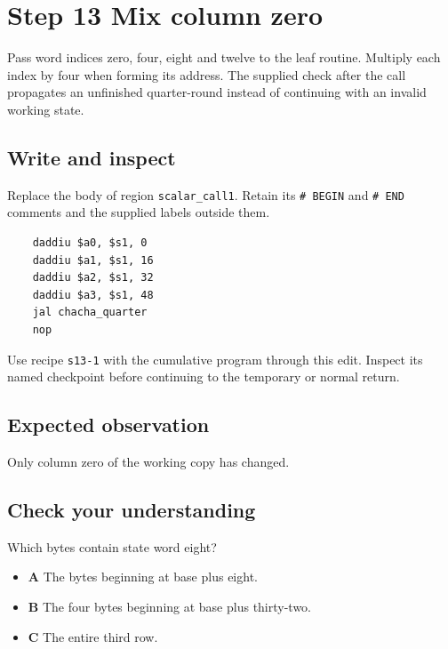 \section{Step 13 Mix column zero}\label{chacha-s13}

Pass word indices zero, four, eight and twelve to the leaf routine. Multiply each index by four when forming its address. The supplied check after the call propagates an unfinished quarter-round instead of continuing with an invalid working state.

\subsection{Write and inspect}
Replace the body of region \texttt{scalar\_call1}. Retain its \texttt{\# BEGIN} and \texttt{\# END} comments and the supplied labels outside them.

\begin{verbatim}
    daddiu $a0, $s1, 0
    daddiu $a1, $s1, 16
    daddiu $a2, $s1, 32
    daddiu $a3, $s1, 48
    jal chacha_quarter
    nop
\end{verbatim}

Use recipe \texttt{s13-1} with the cumulative program through this edit. Inspect its named checkpoint before continuing to the temporary or normal return.

\subsection{Expected observation}
Only column zero of the working copy has changed.

\subsection{Check your understanding}
Which bytes contain state word eight?

\begin{itemize}
\item \textbf{A} The bytes beginning at base plus eight.
\item \textbf{B} The four bytes beginning at base plus thirty-two.
\item \textbf{C} The entire third row.
\end{itemize}
